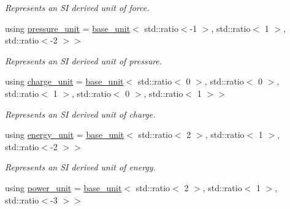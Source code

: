 \begin{DoxyCompactItemize}
\begin{DoxyCompactList}\small\item\em Represents an S\+I derived unit of force. \end{DoxyCompactList}\item 
\hypertarget{namespaceunits_1_1category_adf9fa681139dac718dc7455ca2d5e11f}{}using \hyperlink{namespaceunits_1_1category_adf9fa681139dac718dc7455ca2d5e11f}{pressure\+\_\+unit} = \hyperlink{structunits_1_1base__unit}{base\+\_\+unit}$<$ std\+::ratio$<$-\/1 $>$, std\+::ratio$<$ 1 $>$, std\+::ratio$<$-\/2 $>$$>$\label{namespaceunits_1_1category_adf9fa681139dac718dc7455ca2d5e11f}

\begin{DoxyCompactList}\small\item\em Represents an S\+I derived unit of pressure. \end{DoxyCompactList}\item 
\hypertarget{namespaceunits_1_1category_a2402ebbd5f61c597bf6120629a2582e7}{}using \hyperlink{namespaceunits_1_1category_a2402ebbd5f61c597bf6120629a2582e7}{charge\+\_\+unit} = \hyperlink{structunits_1_1base__unit}{base\+\_\+unit}$<$ std\+::ratio$<$ 0 $>$, std\+::ratio$<$ 0 $>$, std\+::ratio$<$ 1 $>$, std\+::ratio$<$ 0 $>$, std\+::ratio$<$ 1 $>$$>$\label{namespaceunits_1_1category_a2402ebbd5f61c597bf6120629a2582e7}

\begin{DoxyCompactList}\small\item\em Represents an S\+I derived unit of charge. \end{DoxyCompactList}\item 
\hypertarget{namespaceunits_1_1category_a20ac4baa3d6500112b49b00ef502aba1}{}using \hyperlink{namespaceunits_1_1category_a20ac4baa3d6500112b49b00ef502aba1}{energy\+\_\+unit} = \hyperlink{structunits_1_1base__unit}{base\+\_\+unit}$<$ std\+::ratio$<$ 2 $>$, std\+::ratio$<$ 1 $>$, std\+::ratio$<$-\/2 $>$$>$\label{namespaceunits_1_1category_a20ac4baa3d6500112b49b00ef502aba1}

\begin{DoxyCompactList}\small\item\em Represents an S\+I derived unit of energy. \end{DoxyCompactList}\item 
\hypertarget{namespaceunits_1_1category_aa595eeccb878cce2d88a3509aab0b2a6}{}using \hyperlink{namespaceunits_1_1category_aa595eeccb878cce2d88a3509aab0b2a6}{power\+\_\+unit} = \hyperlink{structunits_1_1base__unit}{base\+\_\+unit}$<$ std\+::ratio$<$ 2 $>$, std\+::ratio$<$ 1 $>$, std\+::ratio$<$-\/3 $>$$>$\label{namespaceunits_1_1category_aa595eeccb878cce2d88a3509aab0b2a6}


\end{DoxyCompactItemize}
